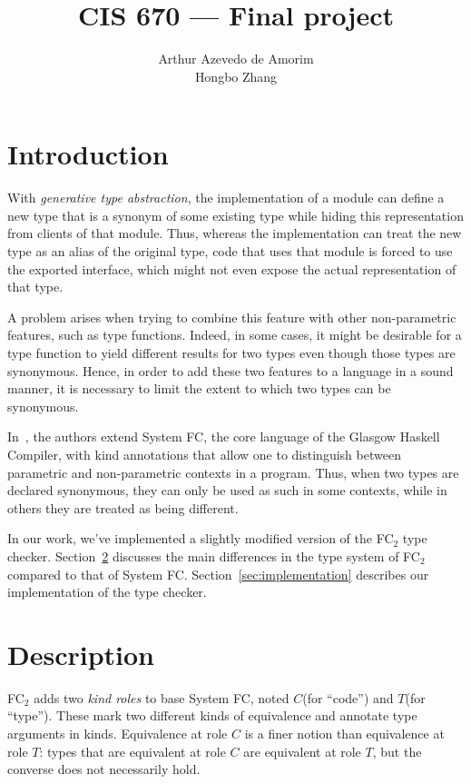\documentclass{article}
\title{CIS 670 --- Final project}
\author{Arthur Azevedo de Amorim \\ Hongbo Zhang}
\newcommand{\fct}{FC\(_2\)\xspace}
\newcommand{\kindc}{\(C\)\xspace}
\newcommand{\kindt}{\(T\)\xspace}
\begin{document}
\maketitle

\section{Introduction}

With \emph{generative type abstraction}, the implementation of a
module can define a new type that is a synonym of some existing type
while hiding this representation from clients of that module. Thus,
whereas the implementation can treat the new type as an alias of the
original type, code that uses that module is forced to use the
exported interface, which might not even expose the actual
representation of that type.

A problem arises when trying to combine this feature with other
non-parametric features, such as type functions. Indeed, in some
cases, it might be desirable for a type function to yield different
results for two types even though those types are synonymous. Hence,
in order to add these two features to a language in a sound manner, it
is necessary to limit the extent to which two types can be synonymous.

In~\cite{newtypes}, the authors extend System FC, the core language of
the Glasgow Haskell Compiler, with kind annotations that allow one to
distinguish between parametric and non-parametric contexts in a
program. Thus, when two types are declared synonymous, they can only
be used as such in some contexts, while in others they are treated as
being different.

In our work, we've implemented a slightly modified version of the \fct
type checker. Section~\ref{sec:description} discusses the main
differences in the type system of \fct compared to that of System
FC. Section~\ref{sec:implementation} describes our implementation of
the type checker.

\section{Description}

\label{sec:description}

\fct adds two \emph{kind roles} to base System FC, noted \kindc (for
``code'') and \kindt (for ``type''). These mark two different kinds of
equivalence and annotate type arguments in kinds. Equivalence at role
\kindc is a finer notion than equivalence at role \kindt: types that
are equivalent at role \kindc are equivalent at role \kindt, but the
converse does not necessarily hold.
\end{document}
